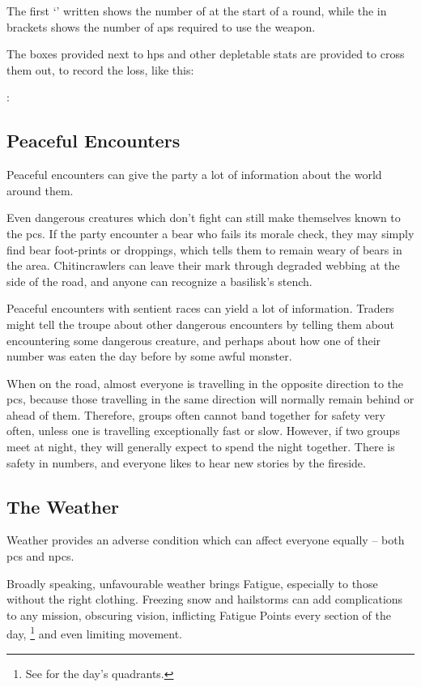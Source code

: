 \begin{multicols}{2}
The first `' written shows the number of  at the start of a round, while the  in brackets shows the number of \glspl{ap} required to use the weapon.

The boxes provided next to \glspl{hp} and other depletable stats are provided to cross them out, to record the loss, like this: 

 :\addtocounter{hp}{-3}
\Repeat{\value{hp}}{\sqn}

\subsection{Peaceful Encounters}

Peaceful encounters can give the party a lot of information about the world around them.

Even dangerous creatures which don't fight can still make themselves known to the \glspl{pc}.
If the party encounter a bear who fails its morale check, they may simply find bear foot-prints or droppings, which tells them to remain weary of bears in the area.
Chitincrawlers can leave their mark through degraded webbing at the side of the road, and anyone can recognize a basilisk's stench.

Peaceful encounters with sentient races can yield a lot of information.
Traders might tell the troupe about other dangerous encounters by telling them about encountering some dangerous creature, and perhaps about how one of their number was eaten the day before by some awful monster.

When on the road, almost everyone is travelling in the opposite direction to the \glspl{pc}, because those travelling in the same direction will normally remain behind or ahead of them.
Therefore, groups often cannot band together for safety very often, unless one is travelling exceptionally fast or slow.
However, if two groups meet at night, they will generally expect to spend the night together.
There is safety in numbers, and everyone likes to hear new stories by the fireside.

\subsection{The Weather}

Weather provides an adverse condition which can affect everyone equally -- both \glspl{pc} and \glspl{npc}.

Broadly speaking, unfavourable weather brings Fatigue, especially to those without the right clothing.
Freezing snow and hailstorms can add complications to any mission, obscuring vision, inflicting Fatigue Points every section of the day,
\footnote{See  for the day's quadrants.}
and even limiting movement.


\end{multicols}
